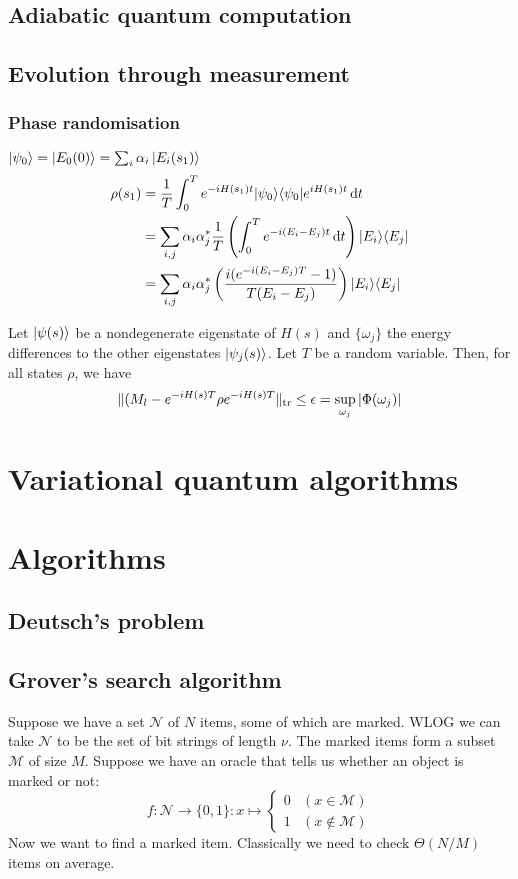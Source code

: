 \section{Adiabatic quantum computation}
\section{Evolution through measurement}
\subsection{Phase randomisation}
$\left| \psi_0 \right\rangle = \left| E_0(0) \right\rangle = \sum_i\alpha_i\left| E_i(s_1) \right\rangle$
\begin{align*}
\rho(s_1) &= \frac{1}{T}\int_0^T e^{-iH(s_1)t}|\psi_0\rangle\langle\psi_0| e^{iH(s_1)t} \operatorname{d \!}{t} \\
&= \sum_{i,j}\alpha_i\alpha_j^* \frac{1}{T}\left(\int_0^T e^{-i(E_i-E_j)t}\operatorname{d \!}{t}\right)|E_i\rangle\langle E_j| \\
&= \sum_{i,j}\alpha_i\alpha_j^* \left(\frac{i(e^{-i(E_i-E_j)T}-1)}{T(E_i-E_j)}\right)|E_i\rangle\langle E_j|
\end{align*}

\begin{theorem}
Let $\left| \psi(s) \right\rangle$ be a nondegenerate eigenstate of $H(s)$ and $\{\omega_j\}$ the energy differences to the other eigenstates $\left| \psi_j(s) \right\rangle$. Let $T$ be a random variable. Then, for all states $\rho$, we have
\[ \lVert(M_l - e^{-iH(s)T}\rho e^{-iH(s)T}\rVert_\text{tr} \leq \epsilon = \sup_{\omega_j}|\Phi(\omega_j)| \]
\end{theorem}

\chapter{Variational quantum algorithms}

\chapter{Algorithms}
\section{Deutsch's problem}

\section{Grover's search algorithm}
Suppose we have a set $\mathcal{N}$ of $N$ items, some of which are marked. WLOG we can take $\mathcal{N}$ to be the set of bit strings of length $\nu$. The marked items form a subset $\mathcal{M}$ of size $M$. Suppose we have an oracle that tells us whether an object is marked or not:
\[ f:\mathcal{N} \to \{0,1\}: x\mapsto \begin{cases}
0 & (x\in \mathcal{M}) \\
1 & (x\notin \mathcal{M})
\end{cases} \]
Now we want to find a marked item. Classically we need to check $\Theta(N/M)$ items on average.

